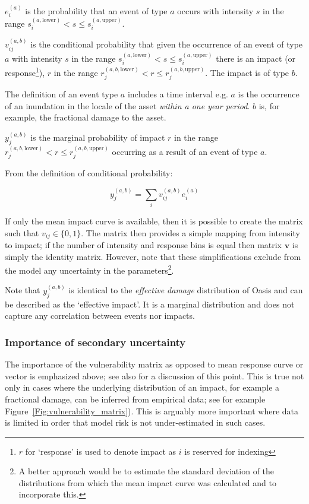 \documentclass[a4paper,11pt]{extarticle} %
\begin{document}
$e^{(a)}_i$ is the probability that an event of type $a$ occurs with intensity $s$ in the range $s^{(a, \text{lower})}_i < s \le s^{(a, \text{upper})}_i$.

$v^{(a, b)}_{ij}$ is the conditional probability that given the occurrence of an event of type $a$ with intensity $s$ in the range $s^{(a, \text{lower})}_i < s \le s^{(a, \text{upper})}_i$ there is an impact (or response\footnote{$r$ for `response' is used to denote impact as $i$ is reserved for indexing}), $r$ in the range $r^{(a,b,\text{lower})}_j < r \le r^{(a,b,\text{upper})}_j$. The impact is of type $b$. 

The definition of an event type $a$ includes a time interval e.g. $a$ is the occurrence of an inundation in the locale of the asset {\it within a one year period}. $b$ is, for example, the fractional damage to the asset.

$y^{(a,b)}_j$ is the marginal probability of impact $r$ in the range $r^{(a,b, \text{lower})}_j < r \le r^{(a,b,\text{upper})}_j$ occurring as a result of an event of type $a$. 

From the definition of conditional probability:

\begin{equation}
	\label{Eq:vulnerability}
	y^{(a,b)}_j = \sum_{i} v^{(a,b)}_{ij} e^{(a)}_i
\end{equation}

If only the mean impact curve is available, then it is possible to create the matrix such that $v_{ij} \in \{0, 1\}$. The matrix then provides a simple mapping from intensity to impact; if the number of intensity and response bins is equal then matrix $\mathbf{v}$ is simply the identity matrix. However, note that these simplifications exclude from the model any uncertainty in the parameters\footnote{A better approach would be to estimate the standard deviation of the distributions from which the mean impact curve was calculated and to incorporate this.}.

Note that $y^{(a,b)}_j$ is identical to the {\it effective damage} distribution of Oasis and can be described as the `effective impact'. It is a marginal distribution and does not capture any correlation between events nor impacts.

\subsubsection{Importance of secondary uncertainty}
The importance of the vulnerability matrix as opposed to mean response curve or vector is emphasized above; see also \cite{Taylor:2015} for a discussion of this point. This is true not only in cases where the underlying distribution of an impact, for example a fractional damage, can be inferred from empirical data; see for example Figure~\ref{Fig:vulnerability_matrix}). This is arguably more important where data is limited in order that model risk is not under-estimated in such cases. 
\end{document}
